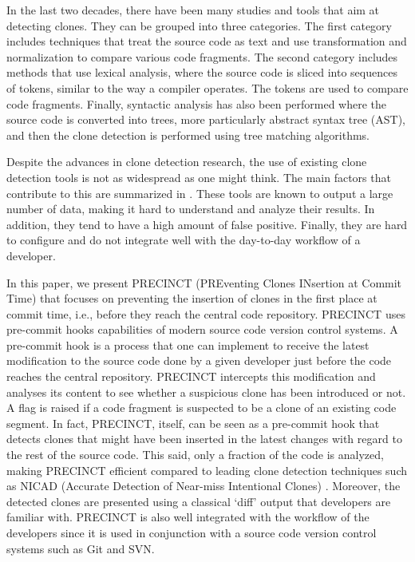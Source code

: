 \documentclass[conference]{IEEEtran}
\begin{document}
In the last two decades, there have been many studies and tools that aim at detecting clones. They can be grouped into three categories.
The first category includes techniques that treat the source code as text and use transformation and normalization  to compare various code fragments\cite{Johnson1994,Johnson1993, Cordy2011, Roy2008}.
The second category includes methods that
use lexical analysis, where the source code is sliced into sequences of tokens, similar to the way a compiler operates\cite{Baker,Bakera,Baker2002,Kamiya2002,Li2006}.
The tokens are used to compare code fragments.
Finally, syntactic analysis has also been performed where the source code is converted into trees, more particularly abstract syntax tree (AST), and then the clone detection is performed using tree matching algorithms\cite{Baxter1998, Komondoor2000, Tairas2006, Falke2008}.

Despite the advances in clone detection research, the use of existing clone detection tools is not as widespread as one might think.
The main factors that contribute to this are summarized in \cite{Johnson2013}. These tools are known to output a large number of data, making it hard to understand and analyze their results. In addition, they tend to have a high amount of false positive.
Finally, they are hard to configure and do not integrate well with the day-to-day workflow of a developer.

In this paper, we present PRECINCT (PREventing Clones INsertion at Commit Time) that focuses on preventing the insertion of clones in the first place at commit time, i.e., before they reach the central code repository. PRECINCT uses pre-commit hooks capabilities of modern source code version control systems. A pre-commit hook is a process that one can implement to receive the latest modification to the source code done by a given developer just before the code reaches the central repository.
PRECINCT intercepts this modification and analyses its  content to see whether a suspicious clone has been introduced or not.
A flag is raised if a code fragment is suspected to be a clone of an existing code segment.
In fact, PRECINCT, itself, can be seen as a pre-commit hook that detects clones that might have been inserted in the latest changes with regard to the rest of the source code.
This said, only a fraction of the code is analyzed, making PRECINCT efficient compared to leading  clone detection techniques such as NICAD (Accurate Detection of Near-miss Intentional Clones) \cite{Cordy2011}.
Moreover, the detected clones are presented using a classical `diff' output that developers are familiar with.
PRECINCT is also well integrated with the workflow of the developers since it is used in conjunction with a source code version control systems such as Git and SVN.
\end{document}
